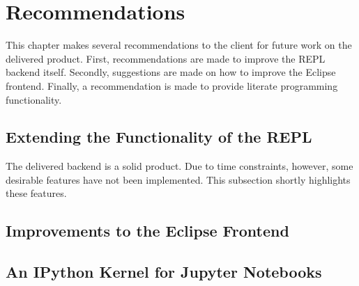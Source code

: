 \chapter{Recommendations} \label{cha:recommendations}

This chapter makes several recommendations to the client for future work on the
delivered product. First, recommendations are made to improve the REPL backend
itself. Secondly, suggestions are made on how to improve the Eclipse frontend.
Finally, a recommendation is made to provide literate programming functionality.

\section{Extending the Functionality of the REPL}
\label{sec:impr-backend}

The delivered backend is a solid product. Due to time constraints, however, some
desirable features have not been implemented. This subsection shortly highlights
these features.





\section{Improvements to the Eclipse Frontend}
\label{sec:impr-eclipse}



\section{An IPython Kernel for Jupyter Notebooks}
\label{sec:discuss-literate-programming}



